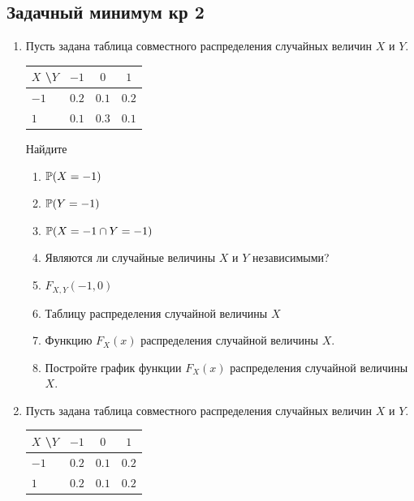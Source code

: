 \subsection{Задачный минимум кр 2}

\begin{enumerate}

\item Пусть задана таблица совместного распределения случайных величин $X$ и $Y$.

\begin{center}\begin{tabular}{lccc}
\toprule
 $X$ \textbackslash $Y$    & $-1$  & $0$   & $1$   \\ \midrule
$-1$                 & $0.2$ & $0.1$ & $0.2$ \\
 $1$                 & $0.1$ & $0.3$ & $0.1$ \\ \bottomrule
\end{tabular}\end{center}


Найдите
\begin{enumerate}
\item $\P(X = -1)$
\item $\P(Y = -1)$
\item $\P(X = -1 \cap Y = -1 )$
\item Являются ли случайные величины $X$ и $Y$ независимыми?
\item $F_{X,Y}(-1,0)$
\item Таблицу распределения случайной величины $X$
\item Функцию $F_{X}(x)$ распределения случайной величины $X$.
\item Постройте график функции $F_{X}(x)$ распределения случайной величины $X$.
\end{enumerate}

\item Пусть задана таблица совместного распределения случайных величин $X$ и $Y$.


\begin{center}\begin{tabular}{lccc}
\toprule
 $X$ \textbackslash $Y$    & $-1$  & $0$  & $1$   \\ \midrule
$-1$                 & $0.2$ & $0.1$ & $0.2$ \\
 $1$                 & $0.2$ & $0.1$ & $0.2$ \\ \bottomrule
\end{tabular}\end{center}


\end{enumerate}
